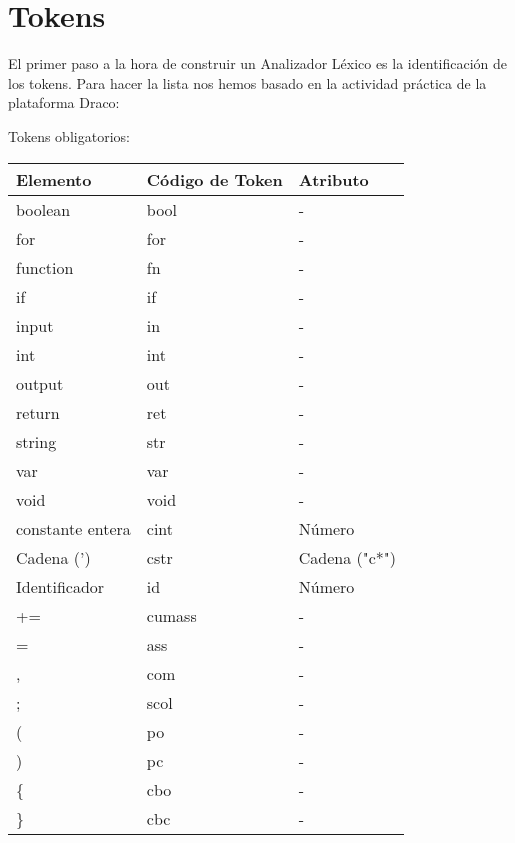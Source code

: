 \documentclass{article}
\begin{document}
\section{Tokens}
El primer paso a la hora de construir un Analizador Léxico es la identificación de los tokens. Para hacer la lista nos hemos basado en la actividad práctica de la plataforma Draco:

\newpage

Tokens obligatorios:

\begin{table}[h!]
    \centering
    \begin{tabular}{|l|l|l|}
        \hline
        \textbf{Elemento} & \textbf{Código de Token} & \textbf{Atributo} \\ \hline
        boolean & bool & - \\ \hline
        for & for & - \\ \hline
        function & fn & - \\ \hline
        if & if & - \\ \hline
        input & in & - \\ \hline
        int & int & - \\ \hline
        output & out & - \\ \hline
        return & ret & - \\ \hline
        string & str & - \\ \hline
        var & var & - \\ \hline
        void & void & - \\ \hline
        constante entera & cint & Número \\ \hline
        Cadena (') & cstr & Cadena ("c*") \\ \hline
        Identificador & id & Número \\ \hline
        += & cumass & - \\ \hline
        = & ass & - \\ \hline
        , & com & - \\ \hline
        ; & scol & - \\ \hline
        ( & po & - \\ \hline
        ) & pc & - \\ \hline
        \{ & cbo & - \\ \hline
        \} & cbc & - \\ \hline
    \end{tabular}
\end{table}
\end{document}
